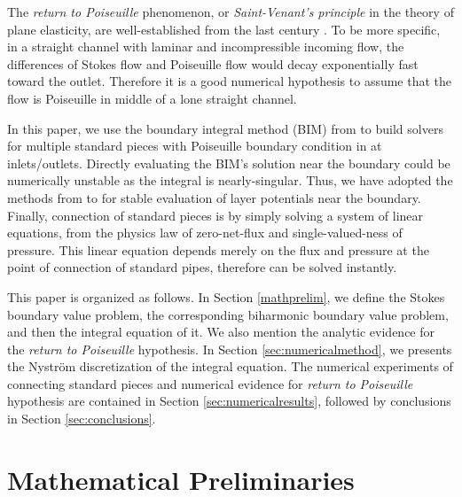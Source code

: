 \documentclass[10pt,twocolumn]{article}
\begin{document}
The \textit{return to Poiseuille} phenomenon, or \textit{Saint-Venant's principle} in the theory of plane elasticity, 
are well-established from the last century 
\cite{coRecentDevelopmentsConcerning1983,gregoryTractionBoundaryValue1980,horganDECAYESTIMATESBIHARMONIC1989}. 
To be more specific, in a straight channel with laminar and incompressible incoming flow, the differences of Stokes flow and Poiseuille flow would decay exponentially fast toward the outlet. 
Therefore it is a good numerical hypothesis to assume that the flow is Poiseuille in middle of a lone straight channel.


In this paper, we use the boundary integral method (BIM) from 
\cite{greengardIntegralEquationMethods1996} to build solvers for multiple standard pieces 
with Poiseuille boundary condition in at inlets/outlets. 
Directly evaluating the BIM's solution near the boundary could be numerically unstable as the integral is nearly-singular.
Thus, we have adopted the methods from 
\cite{wuSolutionStokesFlow2020,helsingEvaluationLayerPotentials2008} 
to for stable evaluation of layer potentials near the boundary. 
Finally, connection of standard pieces is by simply solving a system of linear equations, 
from the physics law of zero-net-flux and single-valued-ness of pressure. 
This linear equation depends merely on the flux and pressure at the
point of connection of standard pipes, therefore can be solved instantly. 

This paper is organized as follows. In Section \ref{mathprelim}, we define the Stokes boundary value problem, 
the corresponding biharmonic boundary value problem, and then the integral equation of it. 
We also mention the analytic evidence for the \textit{return to Poiseuille} hypothesis. 
In Section \ref{sec:numericalmethod}, we presents the Nystr\"om discretization
of the integral equation. 
The numerical experiments of connecting standard pieces and numerical evidence for \textit{return to Poiseuille}
hypothesis are contained in Section \ref{sec:numericalresults}, 
followed by conclusions in Section \ref{sec:conclusions}.

\section{Mathematical Preliminaries\label{mathprelim}}
\end{document}
